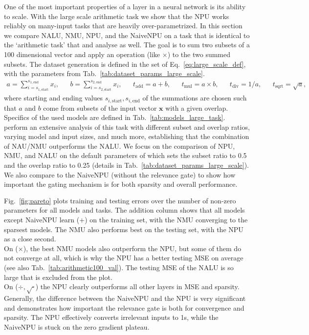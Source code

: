 \documentclass[9pt]{article}
\begin{document}
One of the most important properties of a layer in a neural network is its
ability to scale. With the large scale arithmetic task we show that the NPU
works reliably on many-input tasks that are heavily over-parametrized.  In this
section we compare NALU, NMU, NPU, and the NaiveNPU on a task that is identical
to the `arithmetic task' that \cite{madsen_neural_2020} and
\cite{trask_neural_2018} analyse as well.
The goal is to sum two subsets of a 100 dimensional vector and
apply an operation (like $\times$) to the two summed subsets.  The dataset
generation is defined in the set of Eq.~\ref{eq:large_scale_def}, with the
parameters from Tab.~\ref{tab:dataset_params_large_scale}.
\begin{align}
  \label{eq:large_scale_def}
  a = \sum_{i=s_{1,\text{start}}}^{s_{1,\text{end}}} x_i, &&
  b = \sum_{i=s_{2,\text{start}}}^{s_{2,\text{end}}} x_i, &&
  t_{\text{add}} = a + b, && t_{\text{mul}} = a \times b, &&
  t_{\text{div}} = 1 / a, && t_{\text{sqrt}} = \sqrt{a},
\end{align}
where starting and
ending values $s_{i,\text{start}},s_{i,\text{end}}$ of the summations are chosen
such that $a$ and $b$ come from subsets of the input vector $\bm x$ with a
given overlap.  Specifics of the used models are defined in
Tab.~\ref{tab:models_large_task}.  \cite{madsen_neural_2020} perform an
extensive analysis of this task with different subset and overlap ratios,
varying model and input sizes, and much more, establishing that the combination
of NAU/NMU outperforms the NALU. We focus on the
comparison of NPU, NMU, and NALU on the default parameters of
\cite{madsen_neural_2020} which sets the subset ratio to 0.5 and the overlap
ratio to 0.25 (details in Tab.~\ref{tab:dataset_params_large_scale}).
We also compare to the NaiveNPU (without the relevance gate) to show
how important the gating mechanism is for both sparsity and overall
performance.

Fig.~\ref{fig:pareto} plots training and testing errors over the number of
non-zero parameters for all models and tasks.
The addition column shows that all models except NaiveNPU learn ($+$) on the
training set, with the NMU converging to the sparsest models. The NMU also
performs best on the testing set, with the NPU as a close second.\\
On ($\times$), the best NMU models also outperform the NPU, but some of
them do not converge at all, which is why the NPU has a better testing MSE on
average (see also Tab.~\ref{tab:arithmetic100_val}). The testing MSE of the
NALU is so large that is excluded from the plot.\\
On ($\div,\sqrt{\cdot}$) the NPU clearly outperforms all other layers
in MSE and sparsity. Generally, the difference between the NaiveNPU and the NPU
is very significant and demonstrates how important the relevance gate is both
for convergence and sparsity. The NPU effectively converts irrelevant inputs
to 1s, while the NaiveNPU is stuck on the zero gradient plateau.
\end{document}
